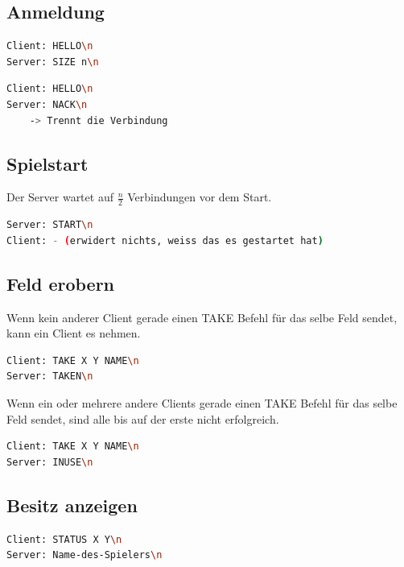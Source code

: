 \subsection{Anmeldung}
\begin{lstlisting}[language=bash,numbers=none,caption={Erfolgreiche Anmeldung}]
Client: HELLO\n
Server: SIZE n\n	
\end{lstlisting}

\begin{lstlisting}[language=bash,numbers=none,caption={Nicht erfolgreiche Anmeldung}]
Client: HELLO\n
Server: NACK\n
    -> Trennt die Verbindung
\end{lstlisting}

\subsection{Spielstart}
\label{spielstart}
Der Server wartet auf $\frac{n}{2}$ Verbindungen vor dem Start.
\begin{lstlisting}[language=bash,numbers=none,caption={Spielstart}]
Server: START\n
Client: - (erwidert nichts, weiss das es gestartet hat)
\end{lstlisting}

\subsection{Feld erobern}
Wenn kein anderer Client gerade einen TAKE Befehl für das selbe Feld sendet, kann ein Client es nehmen.
\begin{lstlisting}[language=bash,numbers=none,caption={Erfolgreiche Eroberung}]
Client: TAKE X Y NAME\n
Server: TAKEN\n
\end{lstlisting}

Wenn ein oder mehrere andere Clients gerade einen TAKE Befehl für das selbe Feld sendet, sind alle bis auf der erste nicht erfolgreich.

\begin{lstlisting}[language=bash,numbers=none,caption={Nichterfolgreiche Eroberung}]
Client: TAKE X Y NAME\n
Server: INUSE\n
\end{lstlisting}

\subsection{Besitz anzeigen}
\begin{lstlisting}[language=bash,numbers=none,caption={Besitz anzeigen}]
Client: STATUS X Y\n
Server: Name-des-Spielers\n
\end{lstlisting}

